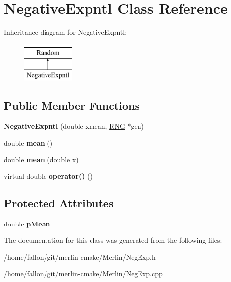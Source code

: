 \hypertarget{classNegativeExpntl}{}\section{Negative\+Expntl Class Reference}
\label{classNegativeExpntl}
Inheritance diagram for Negative\+Expntl\+:\begin{figure}[H]
\begin{center}
\leavevmode
\includegraphics[height=2.000000cm]{classNegativeExpntl}
\end{center}
\end{figure}
\subsection*{Public Member Functions}
\begin{DoxyCompactItemize}
\item 
\mbox{\label{classNegativeExpntl_ad98e2ba38873bda73316853c87d5de1c}} 
{\bfseries Negative\+Expntl} (double xmean, \hyperlink{classRNG}{R\+NG} $\ast$gen)
\item 
\mbox{\label{classNegativeExpntl_a68eca0748dc604a870e739200d1d3fe8}} 
double {\bfseries mean} ()
\item 
\mbox{\label{classNegativeExpntl_a695b6c62e78f000b29f4cc24186e6a65}} 
double {\bfseries mean} (double x)
\item 
\mbox{\label{classNegativeExpntl_ae75530b7489af4772b67a585c0e3cfa7}} 
virtual double {\bfseries operator()} ()
\end{DoxyCompactItemize}
\subsection*{Protected Attributes}
\begin{DoxyCompactItemize}
\item 
\mbox{\label{classNegativeExpntl_ab85d88d3a76f09a0867362b280db62bb}} 
double {\bfseries p\+Mean}
\end{DoxyCompactItemize}


The documentation for this class was generated from the following files\+:\begin{DoxyCompactItemize}
\item 
/home/fallon/git/merlin-\/cmake/\+Merlin/Neg\+Exp.\+h\item 
/home/fallon/git/merlin-\/cmake/\+Merlin/Neg\+Exp.\+cpp\end{DoxyCompactItemize}
